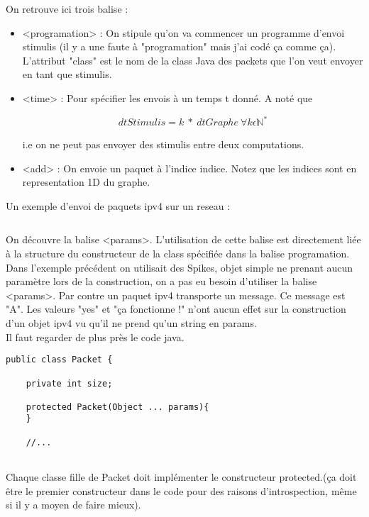 \documentclass{report}
\begin{document}
On retrouve ici trois balise :
\\
\begin{itemize}
\item <programation> : On stipule qu'on va commencer un programme d'envoi stimulis (il y a une faute à "programation" mais  j'ai codé ça comme ça). L'attribut "class" est le nom de la class Java des packets que l'on veut envoyer en tant que stimulis.
\item <time> : Pour spécifier les envois à un temps t donné. A noté que 

\[dtStimulis = k\ *\ dtGraphe\ \forall{k \epsilon{\mathbb{N}^*}}   \] 

i.e on ne peut pas envoyer des stimulis entre deux computations.
\item <add> : On envoie un paquet à l'indice indice. Notez que les indices sont en representation 1D du graphe.
\end{itemize}

Un exemple d'envoi de paquets ipv4 sur un reseau :\\

\inputminted[linenos=true,frame=single,label=ipv4.stimulis]{xml}{/home/nikolai/Work/Loria2014/dnfsim2/statistiques/stimulis/ipv4.stimulis}

On découvre la balise <params>. L'utilisation de cette balise est directement liée à la structure du constructeur de la class spécifiée dans la balise programation. Dans l'exemple précédent on utilisait des Spikes, objet simple ne prenant aucun paramètre lors de la construction, on a pas eu besoin d'utiliser la balise <params>. Par contre un paquet ipv4 transporte un message. Ce message est "A". Les valeurs "yes" et "ça fonctionne !" n'ont aucun effet sur la construction d'un objet ipv4 vu qu'il ne prend qu'un string en params.\\

Il faut regarder de plus près le code java.\\



\begin{verbatim}
public class Packet {

    private int size;    
  
    protected Packet(Object ... params){
    }
    
    //...
    
\end{verbatim}

Chaque classe fille de Packet doit implémenter le constructeur protected.(ça doit être le premier constructeur dans le code pour des raisons d'introspection, même si il y a moyen de faire mieux).\\
\end{document}
